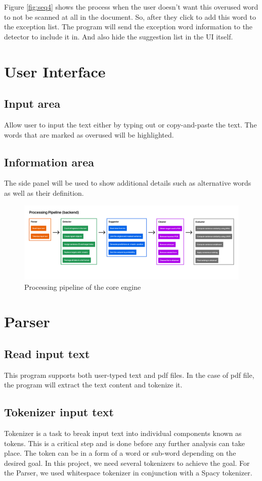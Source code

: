 \documentclass[12pt,oneside,openright,a4paper]{cpe-english-project}
\begin{document}
Figure \ref{fig:seq4} shows the process when the user doesn’t want this overused word to not be scanned at all in the document. So, after they click to add this word to the exception list. The program will send the exception word information to the detector to include it in. And also hide the suggestion list in the UI itself.

\section{User Interface}
\subsection{Input area}
Allow user to input the text either by typing out or copy-and-paste the text.
The words that are marked as overused will be highlighted.
\subsection{Information area}
The side panel will be used to show additional details such as alternative words as well as their definition. 

\begin{figure}[!h]\centering
\includegraphics[width=15cm]{./img/chp3/processsingPipe.png}
\caption{Processing pipeline of the core engine}\label{fig:corePP}
\end{figure}
\section{Parser}
\subsection{Read input text}
This program supports both user-typed text and pdf files. In the case of pdf file, the program will extract the text content and tokenize it.
\subsection{Tokenizer input text}
Tokenizer is a task to break input text into individual components known as tokens. This is a critical step and is done before any further analysis can take place. The token can be in a form of a word or sub-word depending on the desired goal. In this project, we need several tokenizers to achieve the goal. For the Parser, we used whitespace tokenizer in conjunction with a Spacy tokenizer. 
\end{document}
